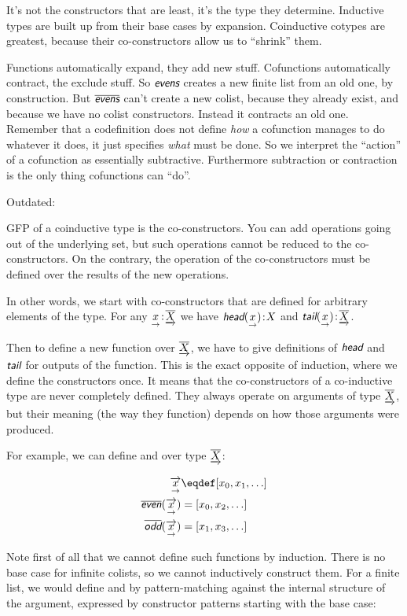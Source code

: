 \documentclass{article}
\begin{document}
It's not the constructors that are least, it's the type they
determine. Inductive types are built up from their base cases by
expansion. Coinductive cotypes are greatest, because their
co-constructors allow us to ``shrink'' them.

Functions automatically expand, they add new stuff. Cofunctions
automatically contract, the exclude stuff. So \(\defn{evens}\) creates
a new finite list from an old one, by construction. But
\(\codefn{evens}\) can't create a new colist, because they already
exist, and because we have no colist constructors. Instead it
contracts an old one. Remember that a codefinition does not define
\textit{how} a cofunction manages to do whatever it does, it just
specifies \textit{what} must be done. So we interpret the ``action''
of a cofunction as essentially subtractive. Furthermore subtraction or
contraction is the only thing cofunctions can ``do''.

Outdated:

GFP of a coinductive type is the co-constructors. You can add
operations going out of the underlying set, but such operations cannot
be reduced to the co-constructors. On the contrary, the operation of
the co-constructors must be defined over the results of the new
operations.

In other words, we start with co-constructors that are defined for
arbitrary elements of the type. For any \(\underset{\rightarrow}{x}\hspace{1pt}\mathpunct{:}\hspace{-1pt}\underrightarrow{\overline{X}}\) we have
\(\tj{\head(\seq{x})}{X}\) and \(\tj{\tail(\seq{x})}{\colist X}\).

Then to define a new function over \(\underrightarrow{\overline{X}}\), we have to give
definitions of \(\head\) and \(\tail\) for outputs of the function.
This is the exact opposite of induction, where we define the
constructors once. It means that the co-constructors of a co-inductive
type are never completely defined. They always operate on arguments of
type \(\underrightarrow{\overline{X}}\), but their meaning (the way they function) depends
on how those arguments were produced.

For example, we can define  and  over type
\(\underrightarrow{\overline{X}}\):

\begin{align}
  \coseq{\seq{x}} & \defeq [x_0, x_1, \ldots] \\
  \codefn{even}(\coseq{\seq{x}}) & = [x_0, x_2, \ldots] \\
  \codefn{odd}(\coseq{\seq{x}})  & = [x_1, x_3, \ldots]
\end{align}

Note first of all that we cannot define such functions by induction.
There is no base case for infinite colists, so we cannot inductively
construct them. For a finite list, we would define  and
 by pattern-matching against the internal structure of the
argument, expressed by constructor patterns starting with the base case:
\end{document}
